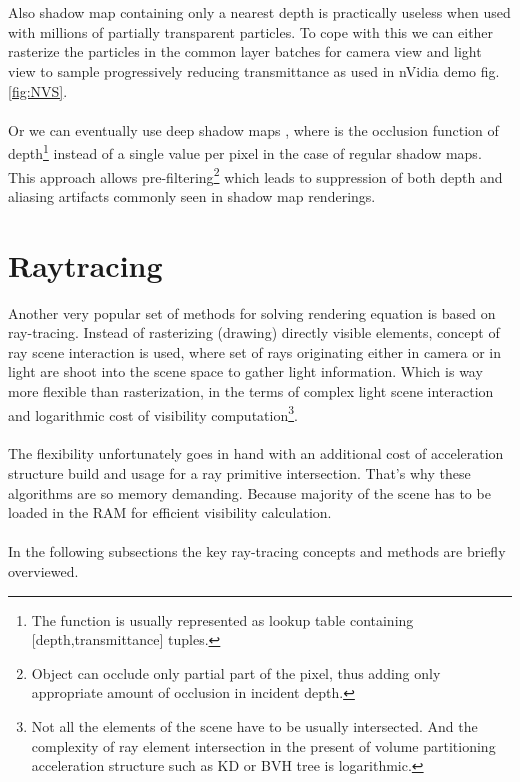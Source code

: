 \\
\\
Also shadow map containing only a nearest depth is practically useless when used with millions of partially transparent particles. To cope with this we can either rasterize the particles in the common layer batches for camera view and light view to sample progressively reducing transmittance as used in nVidia demo fig. \ref{fig:NVS}. 
\\
\\
Or we can eventually use deep shadow maps \cite{LokDSM}, where is the occlusion function of depth\footnote{The function is usually represented as lookup table containing [depth,transmittance] tuples.} instead of a single value per pixel in the case of regular shadow maps. This approach allows pre-filtering\footnote{Object can occlude only partial part of the pixel, thus adding only appropriate amount of occlusion in incident depth.} which leads to suppression of both depth and aliasing artifacts commonly seen in shadow map renderings.
\\



\section{Raytracing}
Another very popular set of methods for solving rendering equation is based on ray-tracing. Instead of rasterizing (drawing) directly visible elements, concept of ray scene interaction is used, where set of rays originating either in camera or in light are shoot into the scene space to gather light information. Which is way more flexible than rasterization, in the terms of complex light scene interaction and logarithmic cost of visibility computation\footnote{Not all the elements of the scene have to be usually intersected. And the complexity of ray element intersection in the present of volume partitioning acceleration structure such as KD or BVH tree is logarithmic.}.
\\
\\
The flexibility unfortunately goes in hand with an additional cost of acceleration structure build and usage for a ray primitive intersection. That's why these algorithms are so memory demanding. Because majority of the scene has to be loaded in the RAM for efficient visibility calculation.
\\
\\
In the following subsections the key ray-tracing concepts and methods are briefly overviewed.  

